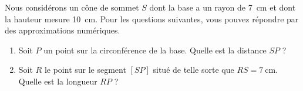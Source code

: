 
\begin{exercice}\label{exo2smath-0182}

    Nous considérons un cône de sommet \( S\) dont la base a un rayon de \SI{7}{\centi\meter} et dont la hauteur mesure \SI{10}{\centi\meter}. Pour les questions suivantes, vous pouvez répondre par des approximations numériques.
    \begin{enumerate}
        \item
            Soit \( P\) un point sur la circonférence de la base. Quelle est la distance \( SP\) ?
        \item
            Soit \( R\) le point sur le segment \( [SP]\) situé de telle sorte que \( RS=\SI{7}{\centi\meter}\). Quelle est la longueur \( RP\) ?
    \end{enumerate}

\end{exercice}
